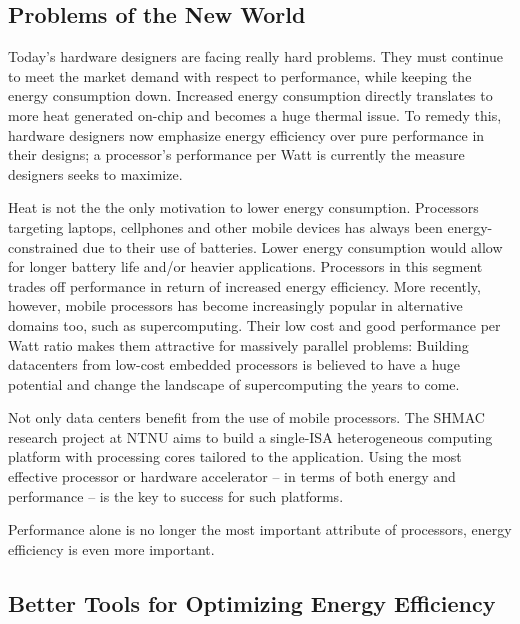 \subsection{Problems of the New World}

Today's hardware designers are facing really hard problems. They must continue
to meet the market demand with respect to performance, while keeping the energy
consumption down. Increased energy consumption directly translates to more heat
generated on-chip and becomes a huge thermal issue. To remedy this, hardware
designers now emphasize energy efficiency over pure performance in their
designs; a processor's performance per Watt is currently the measure designers
seeks to maximize.

Heat is not the the only motivation to lower energy consumption. Processors
targeting laptops, cellphones and other mobile devices has always been
energy-constrained due to their use of batteries. Lower energy consumption would
allow for longer battery life and/or heavier applications. Processors in this
segment trades off performance in return of increased energy efficiency. More
recently, however, mobile processors has become increasingly popular in
alternative domains too, such as supercomputing. Their low cost and good
performance per Watt ratio makes them attractive for massively parallel
problems: Building datacenters from low-cost embedded processors is believed to
have a huge potential and change the landscape of supercomputing the years to
come.





Not only data centers benefit from the use of mobile processors. The SHMAC
research project at NTNU aims to build a single-ISA heterogeneous computing
platform with processing cores tailored to the application. Using the most
effective processor or hardware accelerator -- in terms of both energy
and performance -- is the key to success for such platforms.

Performance alone is no longer the most
important attribute of processors, energy efficiency is even more important.


\subsection{Better Tools for Optimizing Energy Efficiency}

